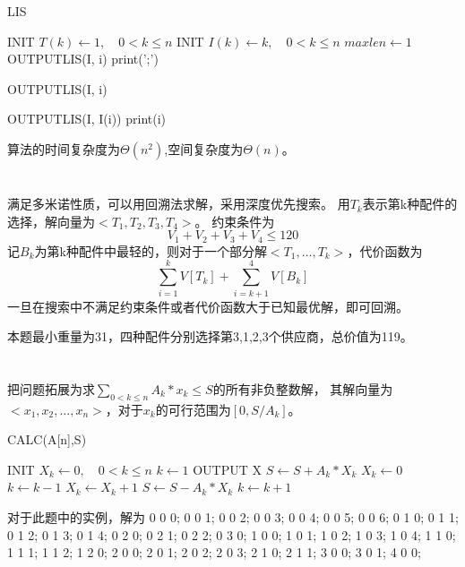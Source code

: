 \documentclass{article}
\begin{document}
\begin{CJK}{UTF8}{gbsn}
\begin{algorithm}
\caption{LIS}
\begin{algorithmic}[1]
\STATE INIT $T(k) \gets 1,\quad 0<k\le n$
\STATE INIT $I(k) \gets k,\quad 0<k\le n$
\STATE $maxlen \gets 1$
        \ENDIF
    \ENDFOR
    \ENDIF
\ENDFOR
{}
    \STATE  OUTPUTLIS(I, i)
    \STATE  print(';')
    \ENDIF
\ENDFOR
\end{algorithmic}
\end{algorithm}

\begin{algorithm}
\caption{OUTPUTLIS(I, i)}
\begin{algorithmic}[1]
\STATE  OUTPUTLIS(I, I(i))
\ENDIF
\STATE  print(i)
\end{algorithmic}
\end{algorithm}

算法的时间复杂度为$\Theta(n^2)$,空间复杂度为$\Theta(n)$。

\section{}
满足多米诺性质，可以用回溯法求解，采用深度优先搜索。
用$T_k$表示第k种配件的选择，解向量为$<T_1,T_2,T_3,T_4>$。
约束条件为
\[V_1+V_2+V_3+V_4 \le 120  \]
记$B_k$为第k种配件中最轻的，则对于一个部分解$<T_1,\dots,T_k>$，代价函数为
\[  \sum_{i=1}^{k}{V[T_k]}+\sum_{i=k+1}^{4}{V[B_k]} \]
一旦在搜索中不满足约束条件或者代价函数大于已知最优解，即可回溯。

本题最小重量为31，四种配件分别选择第3,1,2,3个供应商，总价值为119。

\section{}
把问题拓展为求$\sum_{0<k\le n}{A_k*x_k}\le S$的所有非负整数解，
其解向量为$<x_1,x_2,\dots,x_n>$，对于$x_k$的可行范围为$[0,S/A_k]$。

\begin{algorithm}
\caption{CALC(A[n],S)}
\begin{algorithmic}[1]
\STATE INIT $X_k \gets 0, \quad 0<k\le n$
\STATE $k \gets 1$
        \STATE  OUTPUT X
    \ENDIF
        \STATE  $S \gets S+A_k*X_k$
        \STATE  $X_k \gets 0$
        \STATE  $k  \gets k-1$
        \STATE  $X_k \gets X_k+1$
        \STATE  $S \gets S-A_k*X_k$
    \ELSE 
        \STATE  $k \gets k+1$
    \ENDIF
\ENDWHILE
\end{algorithmic}
\end{algorithm}
对于此题中的实例，解为
0 0 0;
0 0 1;
0 0 2;
0 0 3;
0 0 4;
0 0 5;
0 0 6;
0 1 0;
0 1 1;
0 1 2;
0 1 3;
0 1 4;
0 2 0;
0 2 1;
0 2 2;
0 3 0;
1 0 0;
1 0 1;
1 0 2;
1 0 3;
1 0 4;
1 1 0;
1 1 1;
1 1 2;
1 2 0;
2 0 0;
2 0 1;
2 0 2;
2 0 3;
2 1 0;
2 1 1;
3 0 0;
3 0 1;
4 0 0;

\end{CJK}
\end{document}
